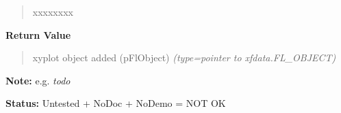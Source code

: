 \begin{boxedminipage}{\funcwidth}
\begin{quote}
\begin{Ventry}{xxxxxxxx}
        \end{Ventry}

      \end{quote}

      \textbf{Return Value}
    \vspace{-1ex}

      \begin{quote}

xyplot object added (pFlObject)
      {\it (type=pointer to xfdata.FL\_OBJECT)}

      \end{quote}

\textbf{Note:} 
e.g. \emph{todo}


\textbf{Status:} 
Untested + NoDoc + NoDemo = NOT OK


    \end{boxedminipage}

    \label{xformslib:flxyplot:fl_set_xyplot_data}

    \vspace{0.5ex}

